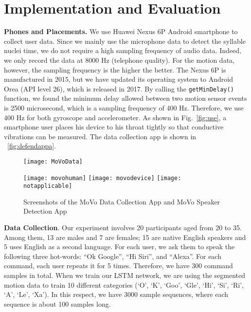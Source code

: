\section{Implementation and Evaluation}


\textbf{Phones and Placements.} We use Huawei Nexus 6P Android smartphone to collect user data. Since we mainly use the microphone data to detect the syllable nuclei time, we do not require a high sampling frequency of audio data. Indeed, we only record the data at 8000 Hz (telephone quality). For the motion data, however, the sampling frequency is the higher the better. The Nexus 6P is manufactured in 2015, but we have updated its operating system to Android Orea (API level 26), which is released in 2017. By calling the \texttt{getMinDelay()} function, we found the minimum delay allowed between two motion sensor events is 2500 microsecond, which is a sampling frequency of 400 Hz. Therefore, we use 400 Hz for both gyroscope and accelerometer. As shown in Fig.~\ref{fig:use}, a smartphone user places his device to his throat tightly so that conductive vibrations can be measured. The data collection app is shown in ~\ref{fig:defendappa}.

\begin{figure}[H]
	\centering
	\begin{minipage}{.3\linewidth}
		\texttt{[image: MoVoData]}
		\label{fig:defendappa}
	\end{minipage}
	\qquad 
	\begin{minipage}{.6\linewidth}
		\texttt{[image: movohuman]}
		\vspace{.1in}
		\texttt{[image: movodevice]}
		\vspace{.1in}
		\texttt{[image: notapplicable]}
	\end{minipage}
	\caption{Screenshots of the MoVo Data Collection App and MoVo Speaker Detection App}	
	\label{fig:defendapp}
\end{figure}

\textbf{Data Collection}. Our experiment involves 20 participants aged from 20 to 35. Among them, 13 are males and 7 are females; 15 are native English speakers and 5 uses English as a second language. For each user, we ask them to speak the following three hot-words: ``Ok Google'', ``Hi Siri'', and ``Alexa''. For each command, each user repeats it for 5 times. Therefore, we have 300 command samples in total. When we train our LSTM network, we are using the segmented motion data to train 10 different categories (`O', `K', `Goo', `Gle', `Hi', `Si', `Ri', `A', `Le', `Xa'). In this respect, we have 3000 sample sequences, where each sequence is about 100 samples long.


